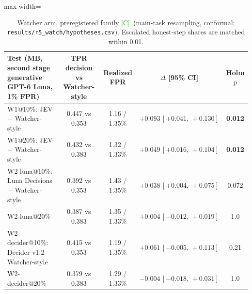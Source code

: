 \documentclass[11pt]{article}
\newcommand{\tC}{\textsf{\scriptsize\textcolor{ForestGreen}{[C]}}\xspace}
\newcommand{\ci}[2]{\,[#1,\,#2]}
\begin{document}
\begin{table}[H]\centering\small
\begin{adjustbox}{max width=\linewidth}
\begin{tabular}{@{}lcccc@{}}
\toprule
Test (MB, second stage generative GPT-6 Luna, 1\% FPR) & TPR decision vs Watcher-style & Realized FPR & $\Delta$ [95\% CI] & Holm $p$\\
\midrule
W1@10\%: JEV $-$ Watcher-style & 0.447 vs 0.353 & 1.16 / 1.35\% & $\mathbf{+0.093\ci{+0.041}{+0.130}}$ & \textbf{0.012}\\
W1@20\%: JEV $-$ Watcher-style & 0.432 vs 0.383 & 1.32 / 1.33\% & $\mathbf{+0.049\ci{+0.016}{+0.104}}$ & \textbf{0.012}\\
W2-luna@10\%: Luna Decisions $-$ Watcher-style & 0.392 vs 0.353 & 1.43 / 1.35\% & $+0.038\ci{+0.004}{+0.075}$ & 0.072\\
W2-luna@20\% & 0.387 vs 0.383 & 1.35 / 1.33\% & $+0.004\ci{-0.012}{+0.019}$ & 1.0\\
W2-decider@10\%: Decider v1.2 $-$ Watcher-style & 0.415 vs 0.353 & 1.19 / 1.35\% & $+0.061\ci{-0.005}{+0.113}$ & 0.21\\
W2-decider@20\% & 0.379 vs 0.383 & 1.29 / 1.33\% & $-0.004\ci{-0.018}{+0.031}$ & 1.0\\
\bottomrule
\end{tabular}
\end{adjustbox}
\caption{Watcher arm, preregistered family \tC\ (main-task resampling, conformal; \nolinkurl{results/r5_watch/hypotheses.csv}). Escalated honest-step shares are matched within 0.01.}\label{tab:watch}
\end{table}
\end{document}
